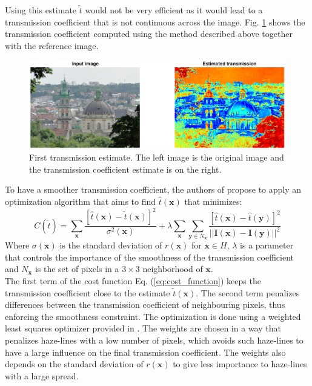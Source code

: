 \documentclass[conference]{IEEEtran}
\begin{document}
Using this estimate $\tilde{t}$ would not be very efficient as it would lead to a transmission coefficient that is not continuous across the image. Fig. \ref{fig:first_transmission} shows the transmission coefficient computed using the method described above together with the reference image.\par
\begin{figure}
    \centering
    \includegraphics[width=\linewidth]{img/noOpti.png}
    \caption{First transmission estimate. The left image is the original image and the transmission coefficient estimate is on the right.}
    \label{fig:first_transmission}
\end{figure}
To have a smoother transmission coefficient, the authors of \cite{dehaze} propose to apply an optimization algorithm that aims to find $\hat{t}(\mathbf{x})$ that minimizes:
\begin{equation}
    \label{eq:cost_function}
    C(\tilde{t}) = \sum_{\mathbf{x}} \frac{\left[\hat{t}(\mathbf{x}) - \tilde{t}(\mathbf{x})\right]^2}{\sigma^2(\mathbf{x})} + \lambda \sum_{\mathbf{x}} \sum_{\mathbf{y} \in N_{\mathbf{x}}} \frac{\left[\hat{t}(\mathbf{x}) - \hat{t}(\mathbf{y})\right]^2}{||\mathbf{I}(\mathbf{x}) - \mathbf{I}(\mathbf{y})||^2}
\end{equation}
Where $\sigma(\mathbf{x})$ is the standard deviation of $r(\mathbf{x})$ for $\mathbf{x} \in H$, $\lambda$ is a parameter that controls the importance of the smoothness of the transmission coefficient and $N_{\mathbf{x}}$ is the set of pixels in a $3 \times 3$ neighborhood of $\mathbf{x}$.\\
The first term of the cost function Eq. (\ref{eq:cost_function}) keeps the transmission coefficient close to the estimate $\tilde{t}(\mathbf{x})$. The second term penalizes differences between the transmission coefficient of neighbouring pixels, thus enforcing the smoothness constraint. 
The optimization is done using a weighted least squares optimizer provided in \cite{github}. The weights are chosen in a way that penalizes haze-lines with a low number of pixels, which avoids such haze-lines to have a large influence on the final transmission coefficient. The weights also depends on the standard deviation of $r(\mathbf{x})$ to give less importance to haze-lines with a large spread. \par
\end{document}
